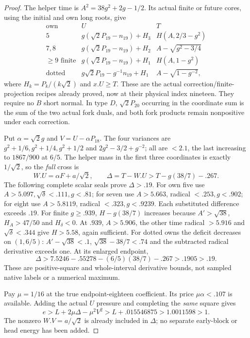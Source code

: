 \documentclass[11pt]{article}
\theoremstyle{definition}
\theoremstyle{remark}
\begin{document}
\begin{proof}
The helper time is $A^2=38g^2+2g-1/2$. Its actual finite or
future cores, using the initial and own long roots, give
\[
\begin{array}{c|c|c}
\text{own}&U&T\\\hline
5&g(\sqrt2P_{19}-n_{19})+H_3&H(A,2/3-g^2)\\
7,8&g(\sqrt2P_{19}-n_{19})+H_2&A-\sqrt{g^2-3/4}\\
\ge9\text{ finite}&g(\sqrt2P_{19}-n_{19})+H_1&H(A,1-g^2)\\
\text{dotted}&g\sqrt2P_{19}-g^{-1}n_{19}+H_1&A-\sqrt{1-g^{-2}},
\end{array}
\]
where $H_k=P_k/(k\sqrt2)$ and $x.U\ge T$.
These are the actual correction/finite-projection recipes already
proved, now at their physical index nineteen. They require no $B$
short normal. In type $D$, $\sqrt2P_{20}$ occurring in the
coordinate sum is the sum of the two actual fork duals, and both
fork products remain nonpositive under each correction.

Put $\alpha=\sqrt2g$ and $V=U-\alpha P_{18}$.
The four variances are $g^2+1/6,g^2+1/4,g^2+1/2$ and
$2g^2-3/2+g^{-2}$; all are $<2.1$, the last increasing to
$1867/900$ at $6/5$. The helper mass in the first three
coordinates is exactly $1/\sqrt2$, so the \emph{full} cross is
\[
 W.U=\alpha F+a/\sqrt2,
 \qquad \Delta=T-W.U>T-g(38/7)-.267.
\]
The following complete scalar seals prove $\Delta>.19$.
For own five use $A>5.097,\sqrt\delta<.111,g<.81$;
for seven use $A>5.663$, radical $<.253,g<.902$;
for eight use $A>5.8119$, radical $<.323,g<.9239$.
Each substituted difference exceeds $.19$.
For finite $g\ge.939$, $H-g(38/7)$ increases because
$A'>\sqrt{38}$, $H_A>47/50$ and $H_\delta<0$.
At $.939$, $A>5.906$, the other time radical $>5.916$ and
$\sqrt\delta<.344$ give $H>5.58$, again sufficient.
For dotted owns the deficit decreases on $(1,6/5)$:
$A'-\sqrt{38}<.1$, $\sqrt{38}-38/7<.74$ and the subtracted
radical derivative exceeds one. At its enlarged endpoint,
\[
 \Delta>7.5246-.55278-(6/5)(38/7)-.267>.1905>.19.
\]
These are positive-square and whole-interval derivative bounds,
not sampled native labels or a numerical maximum.

Pay $\mu=1/16$ at the true endpoint-eighteen coefficient.
Its price $\mu\alpha<.107$ is available. Adding the actual $U$
pressure and completing the \emph{same} square gives
\[
 e>L+2\mu\Delta-\mu^2V^2
 >L+.015546875>1.0011598>1.
\]
The nonzero $W.V=a/\sqrt2$ is already included in $\Delta$;
no separate early-block or head energy has been added.
\end{proof}
\end{document}
